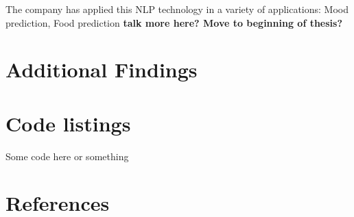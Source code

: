 \documentclass[11pt]{report}
\theoremstyle{Definition}
\theoremstyle{remark}
\begin{document}
The company has applied this NLP technology in a variety of applications: Mood prediction, Food prediction \textbf{talk more here? Move to beginning of thesis?}

\chapter{Additional Findings} \label{appendix:additionalfindings}

\chapter{Code listings} \label{appendix:code}
Some code here or something

\newpage
{}
\chapter*{References}
\printbibliography[notkeyword={multitask}, notkeyword={meta}, title={General}, heading=secbib]
\printbibliography[keyword={multitask}, title={Multitask Learning}, heading=secbib]
\printbibliography[keyword={meta}, title={Meta Learning}, heading=secbib]
\end{document}
